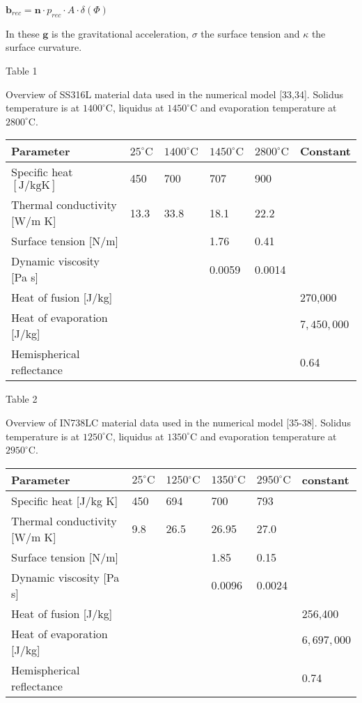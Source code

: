 \documentclass[10pt]{article}
\begin{document}
$\mathbf{b}_{r e c}=\mathbf{n} \cdot p_{r e c} \cdot A \cdot \delta(\Phi)$

In these $\mathbf{g}$ is the gravitational acceleration, $\sigma$ the surface tension and $\kappa$ the surface curvature.

Table 1

Overview of SS316L material data used in the numerical model [33,34]. Solidus temperature is at $1400^{\circ} \mathrm{C}$, liquidus at $1450^{\circ} \mathrm{C}$ and evaporation temperature at $2800^{\circ} \mathrm{C}$.

\begin{center}
\begin{tabular}{llllll}
\hline
Parameter & $25^{\circ} \mathrm{C}$ & $1400^{\circ} \mathrm{C}$ & $1450^{\circ} \mathrm{C}$ & $2800^{\circ} \mathrm{C}$ & Constant \\
\hline
Specific heat $[\mathrm{J} / \mathrm{kg} \mathrm{K}]$ & 450 & 700 & 707 & 900 &  \\
Thermal conductivity [W/m K] & 13.3 & 33.8 & 18.1 & 22.2 &  \\
Surface tension [N/m] &  &  & 1.76 & 0.41 &  \\
Dynamic viscosity [Pa s] &  &  & 0.0059 & 0.0014 &  \\
Heat of fusion [J/kg] &  &  &  &  & 270,000 \\
Heat of evaporation [J/kg] &  &  &  &  & $7,450,000$ \\
Hemispherical reflectance &  &  &  &  & 0.64 \\
\end{tabular}
\end{center}

Table 2

Overview of IN738LC material data used in the numerical model [35-38]. Solidus temperature is at $1250^{\circ} \mathrm{C}$, liquidus at $1350^{\circ} \mathrm{C}$ and evaporation temperature at $2950^{\circ} \mathrm{C}$.

\begin{center}
\begin{tabular}{llllll}
\hline
Parameter & $25^{\circ} \mathrm{C}$ & $1250{ }^{\circ} \mathrm{C}$ & $1350^{\circ} \mathrm{C}$ & $2950^{\circ} \mathrm{C}$ & constant \\
\hline
Specific heat [J/kg K] & 450 & 694 & 700 & 793 &  \\
Thermal conductivity [W/m K] & 9.8 & 26.5 & 26.95 & 27.0 &  \\
Surface tension [N/m] &  &  & 1.85 & 0.15 &  \\
Dynamic viscosity [Pa s] &  &  & 0.0096 & 0.0024 &  \\
Heat of fusion [J/kg] &  &  &  &  & 256,400 \\
Heat of evaporation [J/kg] &  &  &  &  & $6,697,000$ \\
Hemispherical reflectance &  &  &  &  & 0.74 \\
\hline
\end{tabular}
\end{center}
\end{document}
